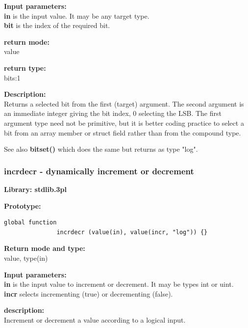             {\bf Input parameters:} \\            
            {\bf in} is the input value. It may be any target type.\\
            {\bf bit} is the index of the required bit.

            {\bf return mode:} \\
            value

            {\bf return type:} \\
            bits:1

            {\bf Description:} \\
            Returns a selected bit from the first (target) argument. The second
            argument is an immediate integer giving the bit index, 0 selecting
            the LSB. The first argument type need not be primitive, but
            it is better coding practice to select a bit from an array member
            or struct field rather than from the compound type.
            
            See also {\bf bitset()}  which does the same
            but returns as type "log".
    



        \subsubsection{incrdecr - dynamically increment or decrement}\label{sec:lfincrdecr}

            {\bf Library: stdlib.3pl}

            {\bf Prototype:} \\
            \vsp
            \begin{lstlisting}[gobble=12, language=threepl]
               global function
               incrdecr (value(in), value(incr, "log")) {}
            \end{lstlisting}

            {\bf Return mode and type:} \\
            value, type(in)

            {\bf Input parameters:} \\            
            {\bf in} is the input value to increment or decrement. It may be
            types int or uint.\\
            {\bf incr} selects incrementing (true) or decrementing (false).

            {\bf description:} \\
            Increment or decrement a value according to a logical input.




